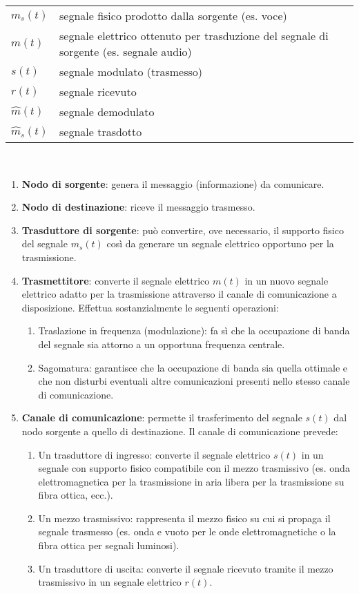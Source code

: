 \begin{tabular}{ll}
    $m_s(t)$ & segnale fisico prodotto dalla sorgente (es. voce) \\
    $m(t)$ & segnale elettrico ottenuto per trasduzione del segnale di sorgente (es. segnale audio) \\
    $s(t)$ & segnale modulato (trasmesso) \\
    $r(t)$ & segnale ricevuto \\
    $\hat{m}(t)$ & segnale demodulato \\
    $\hat{m}_s(t)$ & segnale trasdotto \\
\end{tabular}
\\
\begin{enumerate}
\item \textbf{Nodo di sorgente}: genera il messaggio (informazione) da comunicare.
\item \textbf{Nodo di destinazione}: riceve il messaggio trasmesso.
\item \textbf{Trasduttore di sorgente}: può convertire, ove necessario, il supporto fisico del segnale $m_s(t)$ così da generare un segnale elettrico opportuno per la trasmissione.



\item \textbf{Trasmettitore}: converte il segnale elettrico \( m(t) \) in un nuovo segnale elettrico adatto per la trasmissione attraverso il canale di comunicazione a disposizione. Effettua sostanzialmente le seguenti operazioni:
\begin{enumerate}
    \item Traslazione in frequenza (modulazione): fa sì che la occupazione di banda del segnale sia attorno a un opportuna frequenza centrale.
    \item Sagomatura: garantisce che la occupazione di banda sia quella ottimale e che non disturbi eventuali altre comunicazioni presenti nello stesso canale di comunicazione.
\end{enumerate}

\item \textbf{Canale di comunicazione}: permette il trasferimento del segnale \( s(t) \) dal nodo sorgente a quello di destinazione. Il canale di comunicazione prevede:
\begin{enumerate}
    \item Un trasduttore di ingresso: converte il segnale elettrico \( s(t) \) in un segnale con supporto fisico compatibile con il mezzo trasmissivo (es. onda elettromagnetica per la trasmissione in aria libera per la trasmissione su fibra ottica, ecc.).
    \item Un mezzo trasmissivo: rappresenta il mezzo fisico su cui si propaga il segnale trasmesso (es. onda e vuoto per le onde elettromagnetiche o la fibra ottica per segnali luminosi).
    \item Un trasduttore di uscita: converte il segnale ricevuto tramite il mezzo trasmissivo in un segnale elettrico \( r(t) \).
\end{enumerate}


\end{enumerate}
